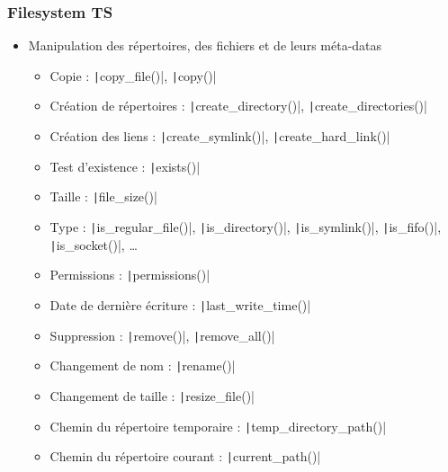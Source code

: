 \documentclass[C++.tex]{subfiles}
\begin{document}
\begin{frame}[fragile]
	\frametitle{Filesystem TS}
	\begin{itemize}
		\item Manipulation des répertoires, des fichiers et de leurs méta-datas
		\begin{itemize}
			\item Copie : \texttt|copy_file()|, \texttt|copy()|
			\item Création de répertoires : \texttt|create_directory()|, \texttt|create_directories()|


			\item Création des liens : \texttt|create_symlink()|, \texttt|create_hard_link()|
			\item Test d'existence : \texttt|exists()|
			\item Taille : \texttt|file_size()|
			\item Type : \texttt|is_regular_file()|, \texttt|is_directory()|, \texttt|is_symlink()|, \texttt|is_fifo()|, \texttt|is_socket()|, \ldots{}
			\item Permissions : \texttt|permissions()|
			\item Date de dernière écriture : \texttt|last_write_time()|
			\item Suppression : \texttt|remove()|, \texttt|remove_all()|


			\item Changement de nom : \texttt|rename()|
			\item Changement de taille : \texttt|resize_file()|
			\item Chemin du répertoire temporaire : \texttt|temp_directory_path()|
			\item Chemin du répertoire courant : \texttt|current_path()|
		\end{itemize}
	\end{itemize}
\end{frame}
\end{document}
